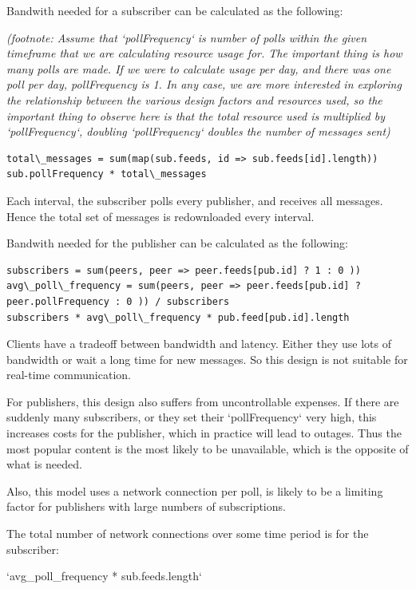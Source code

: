 \documentclass[sigconf]{acmart}
\begin{document}
Bandwith needed for a subscriber can be calculated as the following:

{\em (footnote: Assume that `pollFrequency` is number of polls within
  the given timeframe that we are calculating resource usage for. The
  important thing is how many polls are made.  If we were to calculate
  usage per day, and there was one poll per day, pollFrequency is
  1. In any case, we are more interested in exploring the relationship
  between the various design factors and resources used, so the
  important thing to observe here is that the total resource used is
  {\em multiplied} by `pollFrequency`, doubling `pollFrequency`
  doubles the number of messages sent)}

\begin{verbatim}
total\_messages = sum(map(sub.feeds, id => sub.feeds[id].length))
sub.pollFrequency * total\_messages
\end{verbatim}
Each interval, the subscriber polls every publisher, and receives all
messages.  Hence the total set of messages is redownloaded every
interval.

Bandwith needed for the publisher can be calculated as the following:

\begin{verbatim}
subscribers = sum(peers, peer => peer.feeds[pub.id] ? 1 : 0 ))
avg\_poll\_frequency = sum(peers, peer => peer.feeds[pub.id] ? peer.pollFrequency : 0 )) / subscribers
subscribers * avg\_poll\_frequency * pub.feed[pub.id].length
\end{verbatim}

Clients have a tradeoff between bandwidth and latency. Either they use
lots of bandwidth or wait a long time for new messages. So this design
is not suitable for real-time communication.

For publishers, this design also suffers from uncontrollable
expenses. If there are suddenly many subscribers, or they set their
`pollFrequency` very high, this increases costs for the publisher,
which in practice will lead to outages. Thus the most popular content
is the most likely to be unavailable, which is the opposite of what is
needed.

Also, this model uses a network connection per poll, is likely to be a
limiting factor for publishers with large numbers of subscriptions.

The total number of network connections over some time period is for
the subscriber:

`avg\_poll\_frequency * sub.feeds.length`
\end{document}
